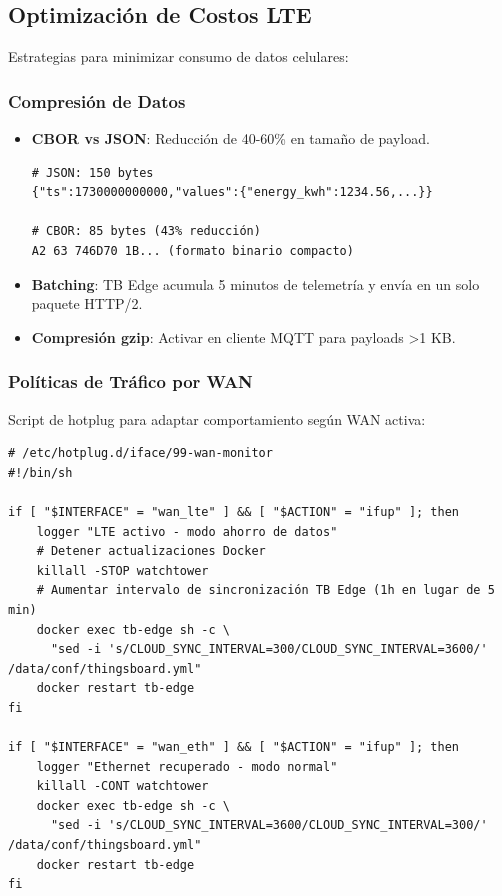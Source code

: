 \subsection{Optimización de Costos LTE}

Estrategias para minimizar consumo de datos celulares:

\subsubsection{Compresión de Datos}

\begin{itemize}
    \item \textbf{CBOR vs JSON}: Reducción de 40-60\% en tamaño de payload.
    \begin{verbatim}
# JSON: 150 bytes
{"ts":1730000000000,"values":{"energy_kwh":1234.56,...}}

# CBOR: 85 bytes (43% reducción)
A2 63 746D70 1B... (formato binario compacto)
    \end{verbatim}
    
    \item \textbf{Batching}: TB Edge acumula 5 minutos de telemetría y envía en un solo paquete HTTP/2.
    \item \textbf{Compresión gzip}: Activar en cliente MQTT para payloads >1 KB.
\end{itemize}

\subsubsection{Políticas de Tráfico por WAN}

Script de hotplug para adaptar comportamiento según WAN activa:

\begin{verbatim}
# /etc/hotplug.d/iface/99-wan-monitor
#!/bin/sh

if [ "$INTERFACE" = "wan_lte" ] && [ "$ACTION" = "ifup" ]; then
    logger "LTE activo - modo ahorro de datos"
    # Detener actualizaciones Docker
    killall -STOP watchtower
    # Aumentar intervalo de sincronización TB Edge (1h en lugar de 5 min)
    docker exec tb-edge sh -c \
      "sed -i 's/CLOUD_SYNC_INTERVAL=300/CLOUD_SYNC_INTERVAL=3600/' /data/conf/thingsboard.yml"
    docker restart tb-edge
fi

if [ "$INTERFACE" = "wan_eth" ] && [ "$ACTION" = "ifup" ]; then
    logger "Ethernet recuperado - modo normal"
    killall -CONT watchtower
    docker exec tb-edge sh -c \
      "sed -i 's/CLOUD_SYNC_INTERVAL=3600/CLOUD_SYNC_INTERVAL=300/' /data/conf/thingsboard.yml"
    docker restart tb-edge
fi
\end{verbatim}

